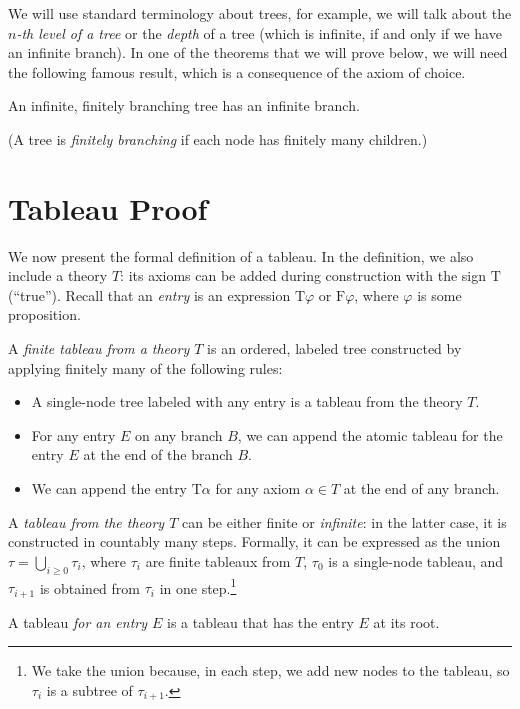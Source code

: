 We will use standard terminology about trees, for example, we will talk about the \emph{$n$-th level of a tree} or the \emph{depth} of a tree (which is infinite, if and only if we have an infinite branch). In one of the theorems that we will prove below, we will need the following famous result, which is a consequence of the axiom of choice.

\begin{lemma}
An infinite, finitely branching tree has an infinite branch.
\end{lemma}
\noindent (A tree is \emph{finitely branching} if each node has finitely many children.)


\section{Tableau Proof}

We now present the formal definition of a tableau. In the definition, we also include a theory $T$: its axioms can be added during construction with the sign $\mathrm{T}$ (``true''). Recall that an \emph{entry} is an expression $\mathrm{T}\varphi$ or $\mathrm{F}\varphi$, where $\varphi$ is some proposition.

\begin{definition}[Tableau]
A \emph{finite tableau from a theory $T$} is an ordered, labeled tree constructed by applying finitely many of the following rules:
\begin{itemize}
    \item A single-node tree labeled with any entry is a tableau from the theory $T$.
    \item For any entry $E$ on any branch $B$, we can append the atomic tableau for the entry $E$ at the end of the branch $B$.
    \item We can append the entry $\mathrm{T}\alpha$ for any axiom $\alpha \in T$ at the end of any branch.
\end{itemize}
A \emph{tableau from the theory $T$} can be either finite or \emph{infinite}: in the latter case, it is constructed in countably many steps. Formally, it can be expressed as the union $\tau = \bigcup_{i \geq 0} \tau_i$, where $\tau_i$ are finite tableaux from $T$, $\tau_0$ is a single-node tableau, and $\tau_{i+1}$ is obtained from $\tau_i$ in one step.\footnote{We take the union because, in each step, we add new nodes to the tableau, so $\tau_i$ is a subtree of $\tau_{i+1}$.}

A tableau \emph{for an entry $E$} is a tableau that has the entry $E$ at its root.
\end{definition}

